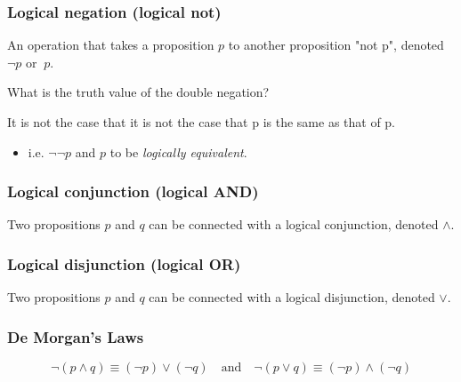     \subsubsection{Logical negation (logical not)}
    \begin{definition}
        An operation that takes a proposition $p$ to another proposition "not p", denoted $\neg p$ or $~p$.
    \end{definition}
    
    \begin{example}
        What is the truth value of the double negation? 

        It is not the case that it is not the case that p is the same as that of p. 
        \begin{itemize}
            \item i.e. $\neg \neg p$ and $p$ to be \emph{logically equivalent}.
        \end{itemize}
    \end{example}

    \subsubsection{Logical conjunction (logical AND)}
    \begin{definition}
        Two propositions $p$ and $q$ can be connected with a logical conjunction, denoted $\land$. 
    \end{definition}
    
    \subsubsection{Logical disjunction (logical OR)}
    \begin{definition}
        Two propositions $p$ and $q$ can be connected with a logical disjunction, denoted $\lor$.  
    \end{definition}

    \subsubsection{De Morgan's Laws}
    \begin{definition}
        \begin{equation}
            \neg (p \land q) \equiv (\neg p) \lor (\neg q) \quad \text{and} \quad \neg (p \lor q) \equiv (\neg p) \land (\neg q)
        \end{equation}
    \end{definition}

